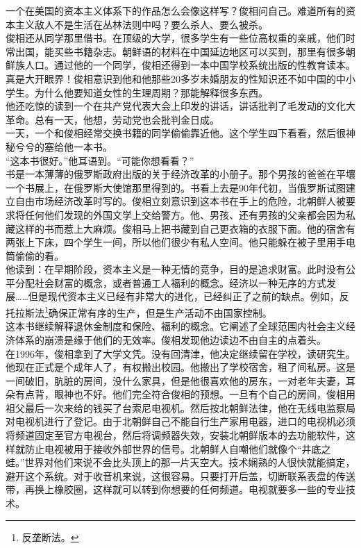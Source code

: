 一个在美国的资本主义体系下的作品怎么会像这样写？俊相问自己。难道所有的资本主义敌人不是生活在丛林法则中吗？要么杀人、要么被杀。\\

俊相还从同学那里借书。在顶级的大学，很多学生有一些位高权重的亲戚，他们时常出国，能买些书籍杂志。朝鲜语的材料在中国延边地区可以买到，那里有很多朝鲜族人口。通过他的一个同学，俊相还得到一本中国学校系统出版的性教育读本。真是大开眼界！俊相意识到他和他那些20多岁未婚朋友的性知识还不如中国的中小学生。为什么他要知道女性的生理周期？那能解释很多东西。\\

他还吃惊的读到一个在共产党代表大会上印发的讲话，讲话批判了毛发动的文化大革命。总有一天，他想，劳动党也会批判金日成。\\

一天，一个和俊相经常交换书籍的同学偷偷靠近他。这个学生四下看看，然后很神秘兮兮的塞给他一本书。\\

“这本书很好。”他耳语到。“可能你想看看？”\\

书是一本薄薄的俄罗斯政府出版的关于经济改革的小册子。那个男孩的爸爸在平壤一个书展上，在俄罗斯大使馆那里得到的。书看上去是90年代初，当俄罗斯试图建立自由市场经济改革时写的。俊相立刻意识到这本书在手上的危险，北朝鲜人被要求将任何他们发现的外国文学上交给警方。他、男孩、还有男孩的父亲都会因为私藏这样的书而惹上大麻烦。俊相马上把书藏到自己更衣箱的衣服下面。他的宿舍有两张上下床，四个学生一间，所以他们很少有私人空间。他只能躲在被子里用手电筒偷偷的看。\\

他读到：在早期阶段，资本主义是一种无情的竞争，目的是追求财富。此时没有公平分配社会财富的概念，或者普通工人福利的概念。经济以一种无序的方式发展……但是现代资本主义已经有非常大的进化，已经纠正了之前的缺点。例如，反托拉斯法\footnote{反垄断法。}确保正常有序的生产，但是生产活动不由国家控制。\\

这本书继续解释退休金制度和保险、福利的概念。它阐述了全球范围内社会主义经济体系的崩溃是缘于他们的无效率。俊相发现他边读边不由自主的点着头。\\

在1996年，俊相拿到了大学文凭。没有回清津，他决定继续留在学校，读研究生。他现在正式是个成年人了，有权搬出校园。他搬出了学校宿舍，租了间私房。这是一间破旧，肮脏的房间，没什么家具，但是他很喜欢他的房东，一对老年夫妻，耳朵有点背，眼神也不好。他们完全符合俊相的预想。一旦有个自己的房间，俊相用祖父最后一次来给的钱买了台索尼电视机。然后按北朝鲜法律，他在无线电监察局对电视机进行了登记。由于北朝鲜自己不能自行生产家用电器，进口的电视机必须将频道固定至官方电视台，然后将调频器失效，安装北朝鲜版本的去功能软件，这样就防止电视被用于接收外部世界的信号。北朝鲜人自嘲他们就像个“井底之蛙。”世界对他们来说不会比头顶上的那一片天空大。技术娴熟的人很快就能搞定，避开这个系统。对于收音机来说，这很容易。只要打开后盖，切断联系表盘的传送带，再换上橡胶圈，这样就可以转到你想要的任何频道。电视就要多一些的专业技术。\\

